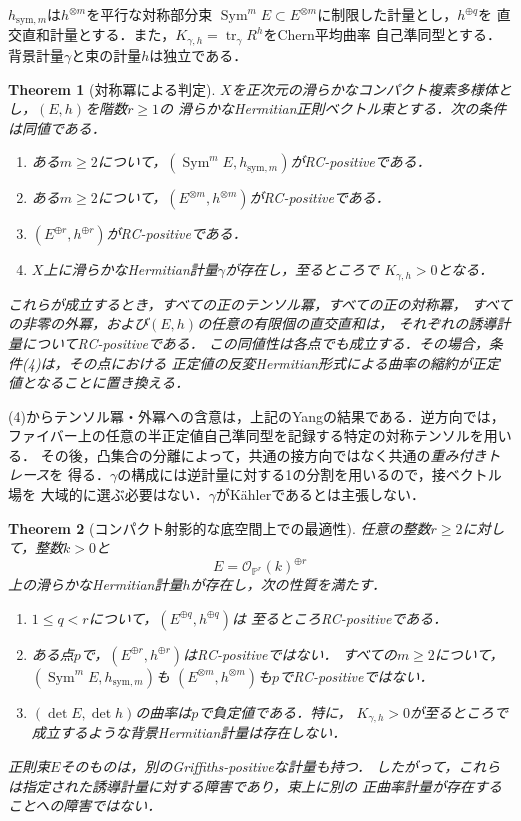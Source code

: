 \documentclass[12pt]{amsart}
\newtheorem{thm}{Theorem}[section]
\theoremstyle{definition}
\theoremstyle{remark}
\numberwithin{equation}{section}
\DeclareMathOperator{\tr}{tr}
\DeclareMathOperator{\Sym}{Sym}
\theoremstyle{definition}
\begin{document}
$h_{\mathrm{sym},m}$は$h^{\otimes m}$を平行な対称部分束
$\Sym^m E\subset E^{\otimes m}$に制限した計量とし，$h^{\oplus q}$を
直交直和計量とする．また，$K_{\gamma,h}=\tr_\gamma R^h$をChern平均曲率
自己準同型とする．背景計量$\gamma$と束の計量$h$は独立である．

\begin{thm}[対称冪による判定]\label{ja:main}
$X$を正次元の滑らかなコンパクト複素多様体とし，$(E,h)$を階数$r\geq1$の
滑らかなHermitian正則ベクトル束とする．次の条件は同値である．
\begin{enumerate}
\item ある$m\geq2$について，$(\Sym^m E,h_{\mathrm{sym},m})$がRC-positiveである．
\item ある$m\geq2$について，$(E^{\otimes m},h^{\otimes m})$がRC-positiveである．
\item $(E^{\oplus r},h^{\oplus r})$がRC-positiveである．
\item $X$上に滑らかなHermitian計量$\gamma$が存在し，至るところで
$K_{\gamma,h}>0$となる．
\end{enumerate}
これらが成立するとき，すべての正のテンソル冪，すべての正の対称冪，
すべての非零の外冪，および$(E,h)$の任意の有限個の直交直和は，
それぞれの誘導計量についてRC-positiveである．
この同値性は各点でも成立する．その場合，条件(4)は，その点における
正定値の反変Hermitian形式による曲率の縮約が正定値となることに置き換える．
\end{thm}

(4)からテンソル冪・外冪への含意は，上記のYangの結果である．逆方向では，
ファイバー上の任意の半正定値自己準同型を記録する特定の対称テンソルを用いる．
その後，凸集合の分離によって，共通の接方向ではなく共通の\emph{重み付きトレース}を
得る．$\gamma$の構成には逆計量に対する1の分割を用いるので，接ベクトル場を
大域的に選ぶ必要はない．$\gamma$がK\"ahlerであるとは主張しない．

\begin{thm}[コンパクト射影的な底空間上での最適性]\label{ja:sharp}
任意の整数$r\geq2$に対して，整数$k>0$と
\[
 E=\mathcal O_{\mathbb P^r}(k)^{\oplus r}
\]
上の滑らかなHermitian計量$h$が存在し，次の性質を満たす．
\begin{enumerate}
\item $1\leq q<r$について，$(E^{\oplus q},h^{\oplus q})$は
至るところRC-positiveである．
\item ある点$p$で，$(E^{\oplus r},h^{\oplus r})$はRC-positiveではない．
すべての$m\geq2$について，$(\Sym^m E,h_{\mathrm{sym},m})$も
$(E^{\otimes m},h^{\otimes m})$も$p$でRC-positiveではない．
\item $(\det E,\det h)$の曲率は$p$で負定値である．特に，
$K_{\gamma,h}>0$が至るところで成立するような背景Hermitian計量は存在しない．
\end{enumerate}
正則束$E$そのものは，別のGriffiths-positiveな計量も持つ．
したがって，これらは指定された誘導計量に対する障害であり，束上に別の
正曲率計量が存在することへの障害ではない．
\end{thm}
\end{document}
